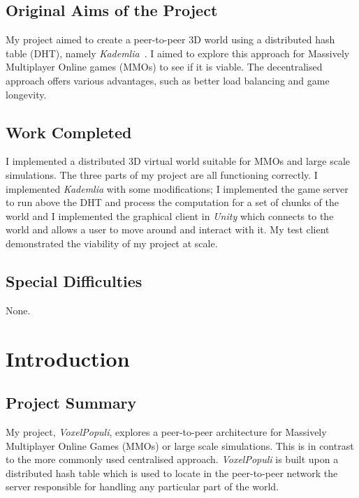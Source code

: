 \documentclass[12pt,notitlepage,a4paper]{report}
\newcommand{\unity}{\emph{Unity}}
\newcommand{\kademlia}{\emph{Kademlia}}
\newcommand{\voxpop}{\emph{VoxelPopuli}}
\begin{document}
	\section*{Original Aims of the Project}
	My project aimed to create a peer-to-peer 3D world using a distributed hash table (DHT), namely \kademlia{}~\cite{kademlia}. I aimed to explore this approach for Massively Multiplayer Online games (MMOs) to see if it is viable. The decentralised approach offers various advantages, such as better load balancing and game longevity.
	
	\section*{Work Completed}
	I implemented a distributed 3D virtual world suitable for MMOs and large scale simulations. The three parts of my project are all functioning correctly. I implemented \kademlia{} with some modifications; I implemented the game server to run above the DHT and process the computation for a set of chunks of the world and I implemented the graphical client in \unity{} which connects to the world and allows a user to move around and interact with it. My test client demonstrated the viability of my project at scale.
	
	\section*{Special Difficulties}
	None.
	
	\tableofcontents
	
	\listoffigures
	
	\listoftables
	
	\listofalgorithms
	
	\newpage

	\clearpage
	
	\setcounter{page}{1}
	\pagestyle{headings}
	\chapter{Introduction}
	
	\section{Project Summary}
	My project, \voxpop{}, explores a peer-to-peer architecture for Massively Multiplayer Online Games (MMOs) or large scale simulations. This is in contrast to the more commonly used centralised approach. \voxpop{} is built upon a distributed hash table which is used to locate in the peer-to-peer network the server responsible for handling any particular part of the world.
	
\end{document}
